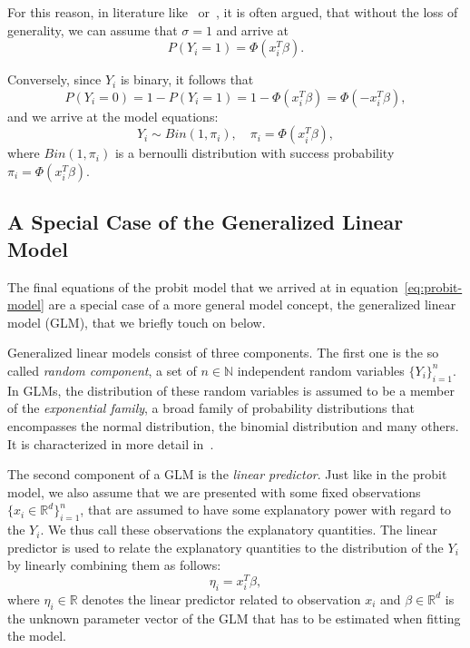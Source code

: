 For this reason, in literature like~\cite{regression-fahrmeir}
or~\cite{glm-agresti}, it is
often argued, that without the loss of generality, we can assume that
$\sigma = 1$ and arrive at
\begin{equation*}
    P(Y_i = 1) = \Phi(x_i^T \beta).
\end{equation*}

\noindent{}Conversely, since $Y_i$ is binary, it follows that
\begin{equation*}
    P(Y_i = 0) = 1 - P(Y_i = 1) = 1 - \Phi(x_i^T \beta) = \Phi(-x_i^T \beta),
\end{equation*}
and we arrive at the model equations:
\begin{equation}
    \label{eq:probit-model}
    Y_i \sim Bin(1, \pi_i), \quad \pi_i = \Phi(x_i^T \beta),
\end{equation}
where $Bin(1, \pi_i)$ is a bernoulli distribution with success
probability $\pi_i = \Phi(x_i^T \beta)$.

\subsection{A Special Case of the Generalized Linear Model}

The final equations of the probit model that we arrived at
in equation~\ref{eq:probit-model} are a special case of a more
general model concept, the generalized linear model (GLM),
that we briefly touch on below.

Generalized linear models consist of three components.
The first one is the so called \textit{random component},
a set of $n \in \mathbb{N}$ independent random variables $\{ Y_i \}_{i=1}^n$.
In GLMs, the distribution of these random variables is assumed
to be a member of the \textit{exponential family}, a broad family of
probability distributions that encompasses the normal distribution,
the binomial distribution and many others.
It is characterized in more detail in~\cite{glm-agresti}.

The second component of a GLM is the \textit{linear predictor}.
Just like in the probit model, we also assume that we are
presented with some fixed observations $\{x_i \in \mathbb{R}^d\}_{i=1}^n$,
that are assumed to have some explanatory power with regard to
the $Y_i$. We thus call these observations the explanatory quantities.
The linear predictor is used to relate the explanatory quantities
to the distribution of the $Y_i$ by linearly combining them as follows:
\begin{equation*}
    \eta_i = x_i^T \beta,
\end{equation*}
where $\eta_i \in \mathbb{R}$ denotes the linear predictor related
to observation $x_i$ and
$\beta \in \mathbb{R}^d$ is the unknown parameter vector of the GLM
that has to be estimated when fitting the model.

